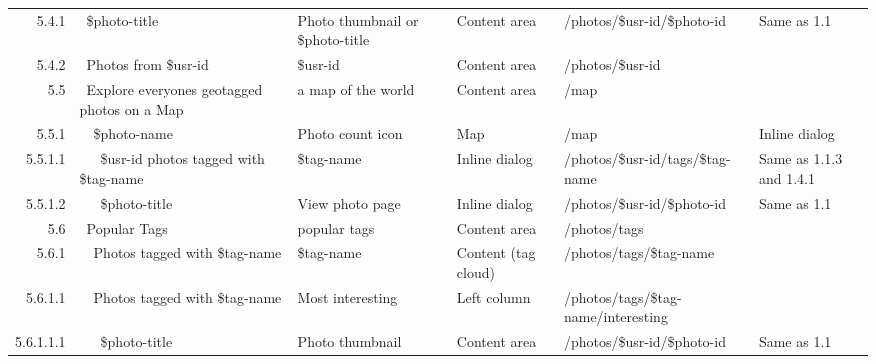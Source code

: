 \documentclass[12pt,a4paper]{article}
\begin{document}
\begin{landscape}
\begin{table}[h!b!p!]
\begin{center}
\begin{tiny}
\begin{tabular}{r|l|l|l|l|p{3cm}}
                5.4.1 &
                ~\$photo-title &
                Photo thumbnail or \$photo-title &
                Content area &
                /photos/\$usr-id/\$photo-id &
                Same as 1.1 \\

                5.4.2 &
                ~Photos from \$usr-id &
                \$usr-id &
                Content area &
                /photos/\$usr-id &
                \\

              5.5 &
              ~Explore everyones geotagged photos on a Map &
              a map of the world &
              Content area &
              /map &
              \\

                5.5.1 &
                ~~\$photo-name &
                Photo count icon &
                Map &
                /map &
                Inline dialog\\

                  5.5.1.1 &
                  ~~~\$usr-id photos tagged with \$tag-name &
                  \$tag-name &
                  Inline dialog &
                  /photos/\$usr-id/tags/\$tag-name &
                  Same as 1.1.3 and 1.4.1\\

                  5.5.1.2 &
                  ~~~\$photo-title &
                  View photo page &
                  Inline dialog &
                  /photos/\$usr-id/\$photo-id &
                  Same as 1.1 \\

              5.6 &
              ~Popular Tags &
              popular tags &
              Content area &
              /photos/tags &
              \\

                5.6.1 &
                ~~Photos tagged with \$tag-name &
                \$tag-name &
                Content (tag cloud) &
                /photos/tags/\$tag-name &
                \\

                  5.6.1.1 &
                  ~~Photos tagged with \$tag-name &
                  Most interesting &
                  Left column &
                  /photos/tags/\$tag-name/interesting &
                  \\

                    5.6.1.1.1 &
                    ~~~\$photo-title &
                    Photo thumbnail &
                    Content area &
                    /photos/\$usr-id/\$photo-id &
                    Same as 1.1 \\


\end{tabular}
\end{tiny}
\end{center}
\end{table}
\end{landscape}
\end{document}
